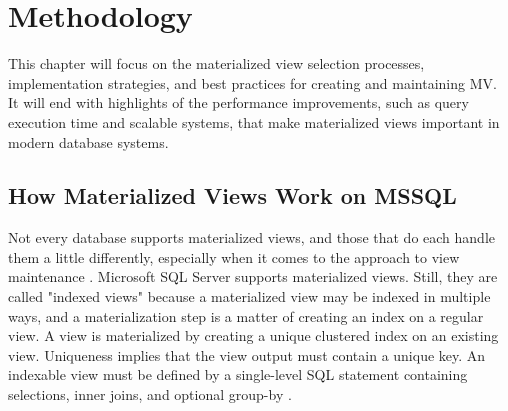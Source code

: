 \section{Methodology}\vspace{.4cm}
This chapter will focus on the materialized view selection processes, implementation strategies, and best practices for creating and maintaining MV. It will end with highlights of the performance improvements, such as query execution time and scalable systems, that make materialized views important in modern database systems.

 \subsection{How Materialized Views Work on MSSQL} Not every database supports materialized views, and those that do each handle them a little differently, especially when it comes to the approach to view maintenance \cite{hattemer-2020}. Microsoft SQL Server supports materialized views. Still, they are called "indexed views" because a materialized view may be indexed in multiple ways, and a materialization step is a matter of creating an index on a regular view. A view is materialized by creating a unique clustered index on an existing view. Uniqueness implies that the view output must contain a unique key. An indexable view must be defined by a single-level SQL statement containing selections, inner joins, and optional group-by \cite{goldstein-2001}.\vspace{0.8cm}

